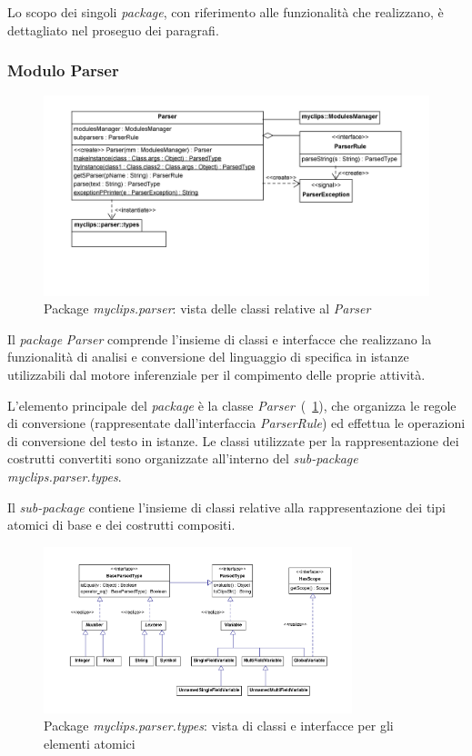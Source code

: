 Lo scopo dei singoli \emph{package}, con riferimento alle funzionalità che realizzano, è dettagliato nel proseguo dei paragrafi.

\subsubsection{Modulo Parser}

\begin{figure}[h]
\centering
\includegraphics[width=1\textwidth]{Immagini/Capitolo3/Classi/myclips_parser_Parser.png}
\caption{Package \emph{myclips.parser}: vista delle classi relative al \emph{Parser}}\label{fig:class-myclips-parser-Parser}
\end{figure}

Il \emph{package} \emph{Parser} comprende l'insieme di classi e interfacce che realizzano la funzionalità di analisi e conversione del linguaggio di specifica in istanze utilizzabili dal motore inferenziale per il compimento delle proprie attività.

L'elemento principale del \emph{package} è la classe \emph{Parser}~(\figurename~\ref{fig:class-myclips-parser-Parser}), che organizza le regole di conversione (rappresentate dall'interfaccia \emph{ParserRule}) ed effettua le operazioni di conversione del testo in istanze. Le classi utilizzate per la rappresentazione dei costrutti convertiti sono organizzate all'interno del \emph{sub-package} \emph{myclips.parser.types}.

Il \emph{sub-package} contiene l'insieme di classi relative alla rappresentazione dei tipi atomici di base e dei costrutti compositi.

\begin{figure}[h]
\centering
\includegraphics[width=0.8\textwidth]{Immagini/Capitolo3/Classi/myclips_parser_types_Atoms.png}
\caption{Package \emph{myclips.parser.types}: vista di classi e interfacce per gli elementi atomici}\label{fig:class-myclips-parser-types-Atoms}
\end{figure}

